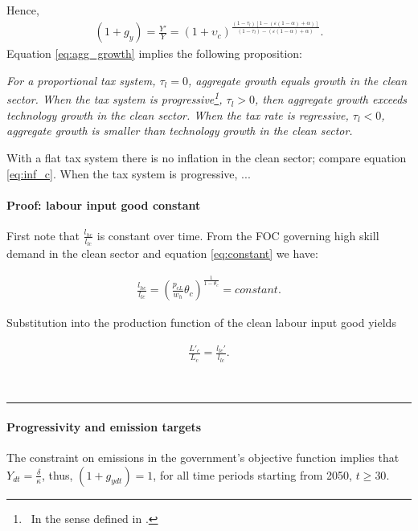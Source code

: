 Hence, 
\begin{align}\label{eq:agg_growth}
	(1+g_y)=\frac{Y'}{Y}=(1+\upsilon_{c})^\frac{(1-\tau_l)[1-(\varepsilon(1-\alpha)+\alpha)]}{(1-\tau_l)-(\varepsilon(1-\alpha)+\alpha)}.
\end{align}
Equation \ref{eq:agg_growth} implies the following proposition:
\begin{prop}
\textit{For a proportional tax system, $\tau_l=0$, aggregate growth equals growth in the clean sector. 
When the tax system is progressive\footnote{\ In the sense defined in \cite{Heathcote2017OptimalFramework}.}, $\tau_l>0$, then aggregate growth exceeds technology growth in the clean sector. When the tax rate is regressive, $\tau_l<0$, aggregate growth is smaller than technology growth in the clean sector. }
\end{prop}
With a flat tax system there is no inflation in the clean sector; compare equation \ref{eq:inf_c}. When the tax system is progressive, ...

\paragraph{Proof: labour input good constant}

First note that $\frac{l_{hc}}{l_{lc}}$ is constant over time. 
From the FOC governing high skill demand in the clean sector and equation \ref{eq:constant} we have:

\begin{align*}
	\frac{l_{hc}}{l_{lc}}=\left(\frac{p_{cL}}{w_h}\theta_c\right)^{\frac{1}{1-\theta_c}}= constant.
\end{align*}

Substitution into the production function of the clean labour input good yields

\begin{align*}
\frac{L'_c}{L_c}=\frac{l_{lc}'}{l_{lc}}.
\end{align*}


\textbf{}
\\

\noindent\rule[1ex]{\textwidth}{1pt}


\paragraph{Progressivity and emission targets}
The constraint on emissions in the government's objective function implies that $Y_{dt}=\frac{\delta}{\kappa}$, thus, $(1+g_{ydt})=1$, for all time periods starting from 2050, $t\geq 30$. 

